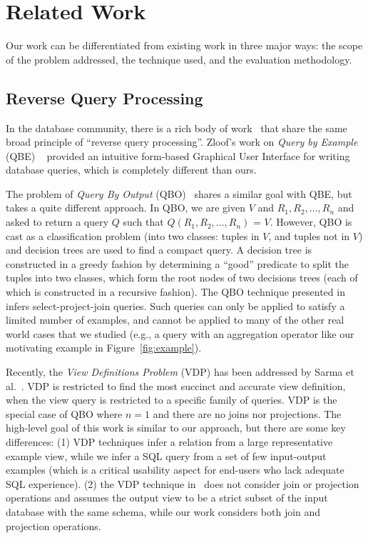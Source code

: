 
\section{Related Work}
\label{sec:related}

Our work can be differentiated from existing work in three major ways: the scope
of the problem addressed, the technique used, and the evaluation methodology.

\subsection{Reverse Query Processing}

In the database community, there is a rich body of
work~\cite{Zloof:1975, Tran:2009, DasSarma:2010} that share the same broad principle
of ``reverse query processing''. Zloof's work on \textit{Query by Example} (QBE)
~\cite{Zloof:1975} provided an intuitive form-based Graphical User Interface for
writing database queries, which is completely different than ours.

The problem of \textit{Query By Output} (QBO)~\cite{Tran:2009} shares a similar
goal with QBE, but takes a quite different approach.
In QBO, we are given $V$ and $R_1, R_2, ..., R_n$ and asked to
return a query $Q$ such that $Q(R_1, R_2, ..., R_n)$ = $V$. However, QBO is cast as
a classification problem (into two classes: tuples in $V$, and tuples not in $V$)
and decision trees are used to find a compact query. A decision tree is constructed
in a greedy fashion by determining a ``good'' predicate to split the tuples into two
classes, which form the root nodes of two decisions trees (each of which is
constructed in a recursive fashion).  The QBO technique presented in~\cite{Tran:2009}
infers select-project-join queries. Such queries can only be applied to
satisfy a limited number of examples, and cannot be applied to many of the other
real world cases that we studied (e.g., a query with an aggregation operator
like our motivating example in Figure~\ref{fig:example}).

Recently, the \textit{View Definitions Problem} (VDP) has been addressed
by Sarma et al.~\cite{DasSarma:2010}.
VDP is restricted to find the most succinct and accurate view definition, when
the view query is restricted to a specific family of queries. VDP is the special
case of QBO where $n = 1$ and there are no joins nor projections.
The high-level goal of this work is similar to our approach, but there
are some key differences: (1) VDP techniques infer a relation from a large representative
example view, while we infer a SQL query from a set of few input-output examples
(which is a critical usability aspect for end-users who lack adequate
SQL experience). (2) the VDP technique in~\cite{DasSarma:2010} does
not consider join or projection
operations and assumes the output view to be a strict subset of the input
database with the same schema, while our work considers both join and
projection operations.


